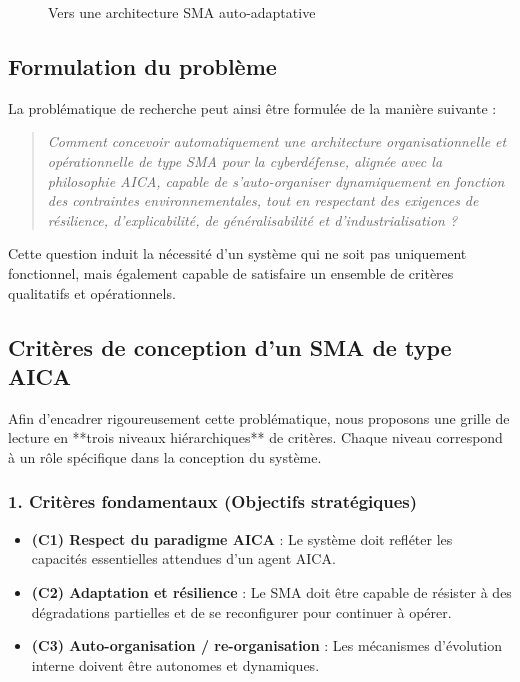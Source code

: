 \documentclass[ twoside,openright,titlepage,numbers=noenddot,headinclude,%
                footinclude=true,cleardoublepage=empty,abstractoff, %
                BCOR=5mm,paper=a4,fontsize=11pt,%
                french,american,%
                ]{scrreprt}
\begin{document}
\begin{figure}[H]
    \centering
    \caption{Vers une architecture SMA auto-adaptative}
\end{figure}

\subsection*{Formulation du problème}

La problématique de recherche peut ainsi être formulée de la manière suivante :

\begin{quote}
    \textit{Comment concevoir automatiquement une architecture organisationnelle et opérationnelle de type SMA pour la cyberdéfense, alignée avec la philosophie AICA, capable de s'auto-organiser dynamiquement en fonction des contraintes environnementales, tout en respectant des exigences de résilience, d'explicabilité, de généralisabilité et d'industrialisation ?}
\end{quote}

Cette question induit la nécessité d'un système qui ne soit pas uniquement fonctionnel, mais également capable de satisfaire un ensemble de critères qualitatifs et opérationnels.

\subsection*{Critères de conception d'un SMA de type AICA}

Afin d'encadrer rigoureusement cette problématique, nous proposons une grille de lecture en **trois niveaux hiérarchiques** de critères. Chaque niveau correspond à un rôle spécifique dans la conception du système.

\subsubsection*{1. Critères fondamentaux (Objectifs stratégiques)}

\begin{itemize}
    \item \textbf{(C1) Respect du paradigme AICA} : Le système doit refléter les capacités essentielles attendues d'un agent AICA.
    \item \textbf{(C2) Adaptation et résilience} : Le SMA doit être capable de résister à des dégradations partielles et de se reconfigurer pour continuer à opérer.
    \item \textbf{(C3) Auto-organisation / re-organisation} : Les mécanismes d'évolution interne doivent être autonomes et dynamiques.
\end{itemize}
\end{document}
